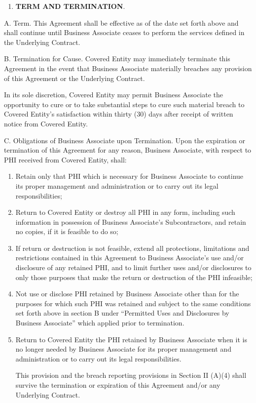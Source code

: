 \documentclass[11pt,a4paper]{article} %
\providecommand{\tightlist}{%
  \setlength{\itemsep}{0pt}\setlength{\parskip}{0pt}}
\begin{document}
\begin{enumerate}
\def\labelenumi{\Roman{enumi}.}
\setcounter{enumi}{2}
\tightlist
\item
  \textbf{TERM AND TERMINATION}.
\end{enumerate}

A. Term. This Agreement shall be effective as of the date set forth
above and shall continue until Business Associate ceases to perform the
services defined in the Underlying Contract.

B. Termination for Cause. Covered Entity may immediately terminate this
Agreement in the event that Business Associate materially breaches any
provision of this Agreement or the Underlying Contract.

In its sole discretion, Covered Entity may permit Business Associate the
opportunity to cure or to take substantial steps to cure such material
breach to Covered Entity's satisfaction within thirty (30) days after
receipt of written notice from Covered Entity.

C. Obligations of Business Associate upon Termination. Upon the
expiration or termination of this Agreement for any reason, Business
Associate, with respect to PHI received from Covered Entity, shall:

\begin{enumerate}
\def\labelenumi{\arabic{enumi}.}
\item
  Retain only that PHI which is necessary for Business Associate to
  continue its proper management and administration or to carry out its
  legal responsibilities;
\item
  Return to Covered Entity or destroy all PHI in any form, including
  such information in possession of Business Associate's Subcontractors,
  and retain no copies, if it is feasible to do so;
\item
  If return or destruction is not feasible, extend all protections,
  limitations and restrictions contained in this Agreement to Business
  Associate's use and/or disclosure of any retained PHI, and to limit
  further uses and/or disclosures to only those purposes that make the
  return or destruction of the PHI infeasible;
\item
  Not use or disclose PHI retained by Business Associate other than for
  the purposes for which such PHI was retained and subject to the same
  conditions set forth above in section B under ``Permitted Uses and
  Disclosures by Business Associate'' which applied prior to
  termination.
\item
  Return to Covered Entity the PHI retained by Business Associate when
  it is no longer needed by Business Associate for its proper management
  and administration or to carry out its legal responsibilities.

  This provision and the breach reporting provisions in Section II
  (A)(4) shall survive the termination or expiration of this Agreement
  and/or any Underlying Contract.
\end{enumerate}
\end{document}
